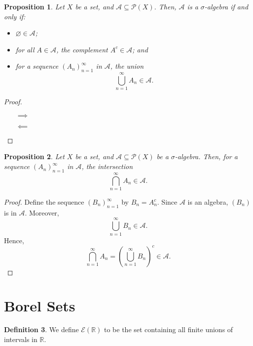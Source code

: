 \documentclass[a4paper, openany]{memoir}
\theoremstyle{definition}
\newtheorem{definition}{Definition}[section]
\theoremstyle{plain}
\newtheorem{proposition}[definition]{Proposition}
\begin{document}
    \begin{proposition}
        Let $X$ be a set, and $\mathcal{A} \subseteq \mathcal{P}(X)$. Then, $\mathcal{A}$ is a $\sigma$-algebra if and only if:
        \begin{itemize}
            \item $\varnothing \in \mathcal{A}$;
            \item for all $A \in \mathcal{A}$, the complement $A^c \in \mathcal{A}$; and
            \item for a sequence $(A_n)_{n=1}^\infty$ in $\mathcal{A}$, the union
            \[\bigcup_{n=1}^\infty A_n \in \mathcal{A}.\]
        \end{itemize}
    \end{proposition}
    \begin{proof}
        \hspace*{0pt}
        \begin{itemize}
            \item[$\implies$] 
            \item[$\impliedby$] 
        \end{itemize}
    \end{proof}

    \begin{proposition}
        Let $X$ be a set, and $\mathcal{A} \subseteq \mathcal{P}(X)$ be a $\sigma$-algebra. Then, for a sequence $(A_n)_{n=1}^\infty$ in $\mathcal{A}$, the intersection
        \[\bigcap_{n=1}^\infty A_n \in \mathcal{A}.\]
    \end{proposition}
    \begin{proof}
        Define the sequence $(B_n)_{n=1}^\infty$ by $B_n = A_n^c$. Since $\mathcal{A}$ is an algebra, $(B_n)$ is in $\mathcal{A}$. Moreover, 
        \[\bigcup_{n=1}^\infty B_n \in \mathcal{A}.\]
        Hence,
        \[\bigcap_{n=1}^\infty A_n = \left(\bigcup_{n=1}^\infty B_n\right)^c \in \mathcal{A}.\]
    \end{proof}
    
    \newpage

    \section{Borel Sets}
    \begin{definition}
        We define $\mathcal{E}(\mathbb{R})$ to be the set containing all finite unions of intervals in $\mathbb{R}$.
    \end{definition}
\end{document}
